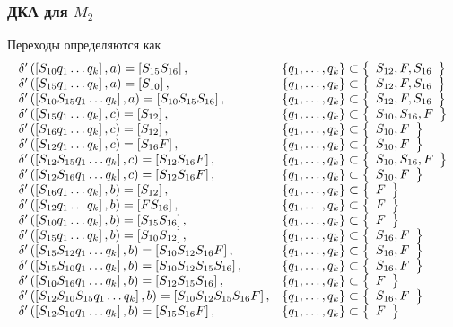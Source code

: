 \subsubsection{ДКА для \(M_2\)}
Переходы определяются как
\begin{align*}
	\begin{array}{ll}
		\gendelta{S_{10}}{a}{S_{15}S_{16}}{\mbqa, S_{16}}                     \\
		\gendelta{S_{15}}{a}{S_{10}}{\mbqa, S_{16}}                           \\
		\gendelta{S_{10}S_{15}}{a}{S_{10}S_{15}S_{16}}{\mbqa, S_{16}}         \\
		\gendelta{S_{15}}{c}{S_{12}}{\mbqc, S_{16}, F}                        \\
		\gendelta{S_{16}}{c}{S_{12}}{\mbqc, F}                                \\
		\gendelta{S_{12}}{c}{S_{16}F}{\mbqc, F}                               \\
		\gendelta{S_{12}S_{15}}{c}{S_{12}S_{16}F}{\mbqc, S_{16}, F}           \\
		\gendelta{S_{12}S_{16}}{c}{S_{12}S_{16}F}{\mbqc, F}                   \\
		\gendelta{S_{16}}{b}{S_{12}}{F}                                       \\
		\gendelta{S_{12}}{b}{FS_{16}}{F}                                      \\
		\gendelta{S_{10}}{b}{S_{15}S_{16}}{F}                                 \\
		\gendelta{S_{15}}{b}{S_{10}S_{12}}{S_{16},F}                          \\
		\gendelta{S_{15}S_{12}}{b}{S_{10}S_{12}S_{16}F}{S_{16},F}             \\
		\gendelta{S_{15}S_{10}}{b}{S_{10}S_{12}S_{15}S_{16}}{S_{16},F}        \\
		\gendelta{S_{10}S_{16}}{b}{S_{12}S_{15}S_{16}}{F}                     \\
		\gendelta{S_{12}S_{10}S_{15}}{b}{S_{10}S_{12}S_{15}S_{16}F}{S_{16},F} \\
		\gendelta{S_{12}S_{10}}{b}{S_{15}S_{16}F}{F}
	\end{array}
\end{align*}
